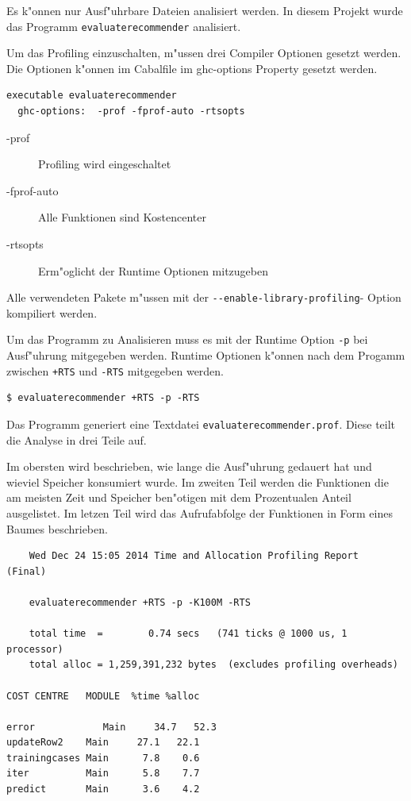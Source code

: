 \documentclass[a4paper, 12pt]{article}
\begin{document}
Es k"onnen nur Ausf"uhrbare Dateien analisiert werden. In diesem Projekt wurde das Programm \verb|evaluaterecommender| analisiert.

Um das Profiling einzuschalten, m"ussen drei Compiler Optionen gesetzt werden. Die Optionen k"onnen im Cabalfile im ghc-options Property gesetzt werden.
\begin{verbatim}
executable evaluaterecommender
  ghc-options:	-prof -fprof-auto -rtsopts
\end{verbatim}
\begin{description}
\item[-prof] Profiling wird eingeschaltet
\item[-fprof-auto] Alle Funktionen sind Kostencenter
\item[-rtsopts] Erm"oglicht der Runtime Optionen mitzugeben
\end{description}

Alle verwendeten Pakete m"ussen mit der \verb|--enable-library-profiling|- Option kompiliert werden.

Um das Programm zu Analisieren muss es mit der Runtime Option \verb|-p| bei Ausf"uhrung mitgegeben werden. Runtime Optionen k"onnen nach dem Progamm zwischen \verb|+RTS| und \verb|-RTS| mitgegeben werden.  

\begin{verbatim}
$ evaluaterecommender +RTS -p -RTS
\end{verbatim}

Das Programm generiert eine Textdatei \verb|evaluaterecommender.prof|. Diese teilt die Analyse in drei Teile auf.

Im obersten wird beschrieben, wie lange die Ausf"uhrung gedauert hat und wieviel Speicher konsumiert wurde. Im zweiten Teil werden die Funktionen die am meisten Zeit und Speicher ben"otigen mit dem Prozentualen Anteil ausgelistet. Im letzen Teil wird das Aufrufabfolge der Funktionen in Form eines Baumes beschrieben.

\begin{verbatim}
	Wed Dec 24 15:05 2014 Time and Allocation Profiling Report  (Final)

	evaluaterecommender +RTS -p -K100M -RTS

	total time  =        0.74 secs   (741 ticks @ 1000 us, 1 processor)
	total alloc = 1,259,391,232 bytes  (excludes profiling overheads)

COST CENTRE   MODULE  %time %alloc

error            Main     34.7   52.3
updateRow2    Main     27.1   22.1
trainingcases Main      7.8    0.6
iter          Main      5.8    7.7
predict       Main      3.6    4.2

\end{verbatim}
\end{document}
